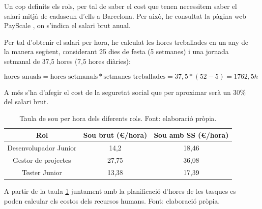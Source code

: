 \documentclass{article}
\begin{document}
Un cop definits els rols, per tal de saber el cost que tenen necessitem saber el salari mitjà de cadascun d'ells a Barcelona. Per això, he consultat la pàgina web PayScale \cite{payscalePayscaleSalary}, on s'indica el salari brut anual. 

Per tal d'obtenir el salari per hora, he calculat les hores treballades en un any de la manera següent, considerant 25 dies de festa (5 setmanes) i una jornada setmanal de 37,5 hores (7,5 hores diàries):

$$\text{hores anuals} = \text{hores setmanals} * \text{setmanes treballades}= 37,5 * (52 - 5) = 1762,5 h $$

A més s'ha d'afegir el cost de la seguretat social que per aproximar serà un 30\% del salari brut.

\begin{table}[H]
    \centering
    \caption{Taula de sou per hora dels diferents rols. Font: elaboració pròpia.}
    \begin{tabular}{|c|c|c|}
         \hline
         Rol & Sou brut (€/hora) & Sou amb SS (€/hora) \\
         \hline
         \hline
         Desenvolupador Junior & 14,2 \cite{payscaleJuniorSoftware} & 18,46 \\
         Gestor de projectes & 27,75 \cite{payscaleProjectManager} & 36,08 \\
         Tester Junior & 13,38 \cite{payscaleSoftwareTester} & 17,39 \\
         \hline
    \end{tabular}
    \label{tab:souperhora}
\end{table}

A partir de la taula \ref{tab:souperhora} juntament amb la planificació d'hores de les tasques es poden calcular els costos dels recursos humans. Font: elaboració pròpia.
\end{document}
